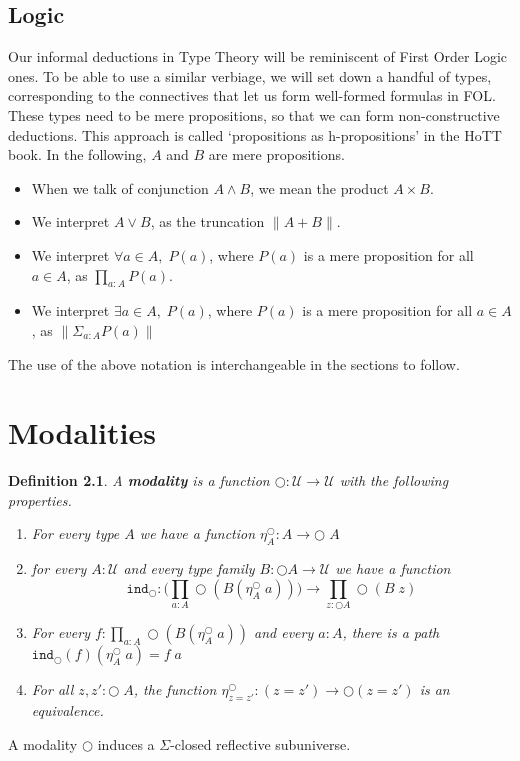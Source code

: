 \documentclass[12pt]{report}
\newtheorem{defn}[thm]{Definition}
\begin{document}
\section{Logic}
Our informal deductions in Type Theory will be reminiscent of First Order Logic ones. 
To be able to use a similar verbiage, we will set down a handful of types, corresponding to the connectives that let us form well-formed formulas in FOL. 
These types need to be mere propositions, so that we can form non-constructive deductions. 
This approach is called `propositions as h-propositions' in the HoTT book. 
In the following, $A$ and $B$ are mere propositions.
\begin{itemize}
\item When we talk of conjunction $A \wedge B$, we mean the product $A \times B$. 
\item We interpret $A \vee B$, as the truncation $\| A + B\|$.
\item We interpret $\forall a\in A,\; P(a)$, where $P(a)$ is a mere proposition for all $a \in A$, as $\prod_{a : A}P(a)$. 
\item We interpret $ \exists a \in A,\; P(a)$, where $P(a)$ is a mere proposition for all $a \in A$, as $\| \Sigma_{a : A} P(a) \|$
\end{itemize}
The use of the above notation is interchangeable in the sections to follow.


\chapter{Modalities}
\begin{defn}
A \textbf{modality} is a function $\bigcirc : \mathcal{U} \rightarrow \mathcal{U}$ with the following properties.
\begin{enumerate}
	\item For every type $A$ we have a function $\eta_A^\bigcirc : A \rightarrow \bigcirc\; A$
	\item for every $A : \mathcal{U}$ and every type family $B : \bigcirc A \rightarrow \mathcal{U}$ we have a function
	$$\mathtt{ind}_\bigcirc : \Big( \prod_{a : A}\bigcirc (B (\eta_A^\bigcirc\; a)) \Big) \rightarrow \prod_{z : \bigcirc A} \bigcirc (B\; z)$$
	\item For every $f : \prod_{a : A} \bigcirc (B(\eta_A^\bigcirc\; a))$ and every $a : A$, there is a path $\mathtt{ind}_\bigcirc (f)(\eta_A^\bigcirc\; a) = f\; a$
	\item For all $z,z' : \bigcirc \; A$, the function $\eta_{z=z'}^\bigcirc : (z = z') \rightarrow \bigcirc (z = z')$ is an equivalence.

\end{enumerate}
\end{defn}
A modality $\bigcirc$ induces a $\Sigma$-closed reflective subuniverse.
\end{document}
